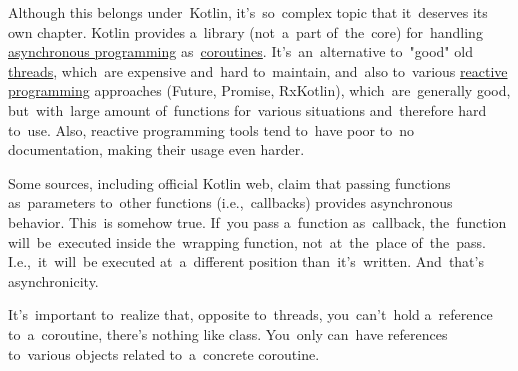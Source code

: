 \label{kotlincoroutine}
Although this belongs under~Kotlin, it's~so~complex topic that it~deserves its own chapter.
Kotlin provides a~library (not~a~part of~the~core) for~handling \hyperref[concurrentparallelasynchronous]{asynchronous programming} as~\hyperref[coroutines]{coroutines}.
It's~an~alternative to~"good" old \hyperref[coroutines]{threads}, which~are expensive and~hard to~maintain, and~also to~various \hyperref[reactiveprogramming]{reactive programming} approaches (Future, Promise, RxKotlin), which~are~generally good, but~with~large amount of~functions for~various situations and~therefore hard to~use.
Also, reactive programming tools tend to~have poor to~no documentation, making their usage even harder.

\note Some sources, including official Kotlin web, claim that passing functions as~parameters to~other functions (i.e.,~callbacks) provides asynchronous behavior.
This~is somehow true.
If~you pass a~function as~callback, the~function will~be~executed inside the~wrapping function, not~at~the~place of~the~pass.
I.e.,~it~will~be executed at~a~different position than~it's~written.
And~that's asynchronicity.

\warning It's~important to~realize that, opposite to~threads, you~can't~hold a~reference to~a~coroutine, there's nothing like  class.
You~only can~have references to~various objects related to~a~concrete coroutine.

